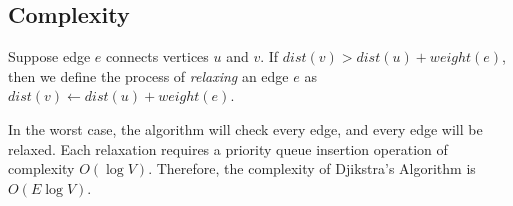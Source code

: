 \subsection{Complexity}

Suppose edge $e$ connects vertices $u$ and $v$. If $dist(v) > dist(u) + weight(e)$, then we define the process of \textit{relaxing} an edge $e$ as $dist(v) \gets dist(u) + weight(e)$.

In the worst case, the algorithm will check every edge, and every edge will be relaxed. Each relaxation requires a priority queue insertion operation of complexity $O(\log V)$. Therefore, the complexity of Djikstra's Algorithm is $O(E \log V)$.

